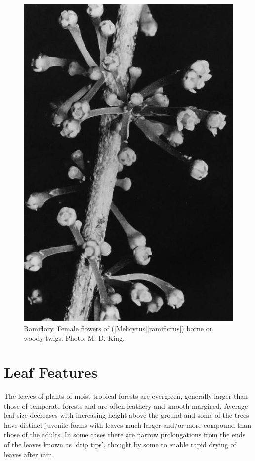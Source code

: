 \begin{figure}[t]
\begin{minipage}[t]{\textwidth}
\begin{minipage}[t]{(\textwidth-\fgap) * \real{0.372}}
			\includegraphics[width=\textwidth]{graphics/fig_017}
			\caption[Ramiflory.
			Female flowers of mahoe]{Ramiflory.
			Female flowers of  ([Melicytus][ramiflorus]) borne on woody twigs.
			Photo:  M. D. King.}%
			\label{fig:17mahoe}
		\end{minipage}
	\end{minipage}
\end{figure}

\section{Leaf Features}

The leaves of plants of moist tropical forests are evergreen, generally larger than those of temperate forests and are often leathery and smooth-margined.
Average leaf size decreases with increasing height above the ground and some of the trees have distinct juvenile forms with leaves much larger and/or more compound than those of the adults.
In some cases there are narrow prolongations from the ends of the leaves known as `drip tips', thought by some to enable rapid drying of leaves after rain.


